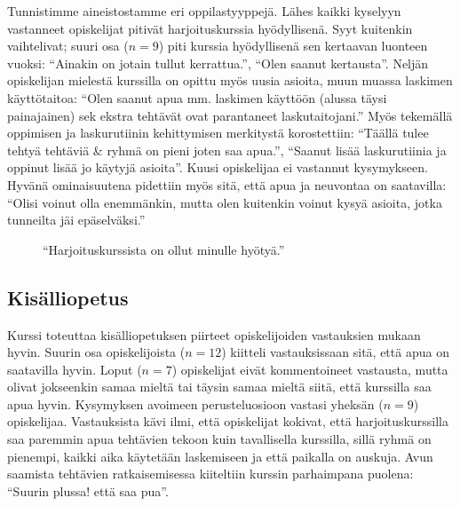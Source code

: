 Tunnistimme aineistostamme eri oppilastyyppejä.
Lähes kaikki kyselyyn vastanneet opiskelijat pitivät harjoituskurssia hyödyllisenä.
Syyt kuitenkin vaihtelivat; suuri osa ($n=9$) piti kurssia hyödyllisenä sen kertaavan luonteen vuoksi: ``Ainakin on jotain tullut kerrattua.'', ``Olen saanut kertausta''.
Neljän opiskelijan mielestä kurssilla on opittu myös uusia asioita, muun muassa laskimen käyttötaitoa: ``Olen saanut apua mm. laskimen käyttöön (alussa täysi painajainen) sek ekstra tehtävät ovat parantaneet laskutaitojani.''
Myös tekemällä oppimisen ja laskurutiinin kehittymisen merkitystä korostettiin: ``Täällä tulee tehtyä tehtäviä & ryhmä on pieni joten saa apua.'', ``Saanut lisää laskurutiinia ja oppinut lisää jo käytyjä asioita''. 
Kuusi opiskelijaa ei vastannut kysymykseen.
Hyvänä ominaisuutena pidettiin myös sitä, että apua ja neuvontaa on saatavilla: ``Olisi voinut olla enemmänkin, mutta olen kuitenkin voinut kysyä asioita, jotka tunneilta jäi epäselväksi.''

\begin{figure}[h!]
\centering
{}
\caption{``Harjoituskurssista on ollut minulle hyötyä.''}
\end{figure}

\subsection{Kisälliopetus}
Kurssi toteuttaa kisälliopetuksen piirteet opiskelijoiden vastauksien mukaan hyvin.
Suurin osa opiskelijoista ($n=12$) kiitteli vastauksissaan sitä, että apua on saatavilla hyvin.
Loput ($n=7$) opiskelijat eivät kommentoineet vastausta, mutta olivat jokseenkin samaa mieltä tai täysin samaa mieltä siitä, että kurssilla saa apua hyvin.
Kysymyksen avoimeen perusteluosioon vastasi yheksän ($n=9$) opiskelijaa. Vastauksista kävi ilmi, että opiskelijat kokivat, että harjoituskurssilla saa paremmin apua tehtävien tekoon kuin tavallisella kurssilla, sillä ryhmä on pienempi, kaikki aika käytetään laskemiseen ja että paikalla on auskuja. Avun saamista tehtävien ratkaisemisessa kiiteltiin kurssin parhaimpana puolena: ``Suurin plussa! että saa pua''. 

